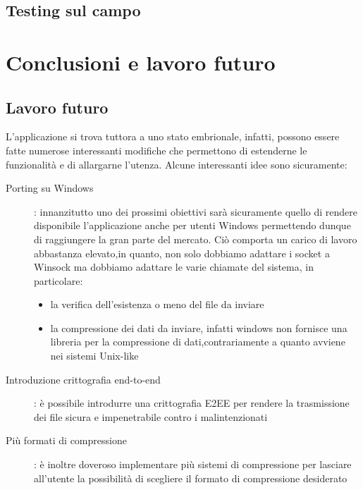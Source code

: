 \documentclass[11pt,fleqn]{book} %
\begin{document}
\section{Testing sul campo}





\chapter{Conclusioni e lavoro futuro}

\section{Lavoro futuro}
L'applicazione si trova tuttora a uno stato embrionale, infatti, possono essere fatte numerose interessanti modifiche che permettono di estenderne le funzionalità e di allargarne l'utenza. 
Alcune interessanti idee sono sicuramente:
\begin{description}
	\item[Porting su Windows]: innanzitutto uno dei prossimi obiettivi sarà sicuramente quello di rendere disponibile l'applicazione anche per 				utenti Windows permettendo dunque di raggiungere la gran parte del mercato. Ciò comporta un carico di lavoro abbastanza elevato,in quanto, 			non solo dobbiamo adattare i socket a Winsock ma dobbiamo adattare le varie chiamate del sistema, in particolare:
			\begin{itemize}
				\item la verifica dell'esistenza o meno del file da inviare
				\item la compressione dei dati da inviare, infatti windows non fornisce una libreria  per la compressione di dati,contrariamente a 					quanto avviene nei sistemi Unix-like
			\end{itemize}
	\item[Introduzione crittografia end-to-end]: è possibile introdurre una crittografia E2EE per rendere la trasmissione dei file sicura e 				impenetrabile contro i malintenzionati
	\item[Più formati di compressione]: è inoltre doveroso implementare più sistemi di compressione per lasciare all'utente la possibilità di 				scegliere il formato di compressione desiderato
\end{description}
\end{document}
